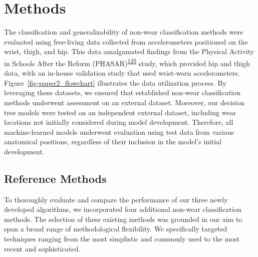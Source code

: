 \documentclass[
  10pt,
]{scrbook}
\begin{document}
\hypertarget{methods-1}{%
\section{Methods}\label{methods-1}}

The classification and generalizability of non-wear classification
methods were evaluated using free-living data collected from
accelerometers positioned on the wrist, thigh, and hip. This data
amalgamated findings from the Physical Activity in Schools After the
Reform
(PHASAR)\textsuperscript{\protect\hyperlink{ref-pedersen_protocol_2018}{135}}
study, which provided hip and thigh data, with an in-house validation
study that used wrist-worn accelerometers.
Figure~\ref{fig-paper2_flowchart} illustrates the data utilization
process. By leveraging these datasets, we ensured that established
non-wear classification methods underwent assessment on an external
dataset. Moreover, our decision tree models were tested on an
independent external dataset, including wear locations not initially
considered during model development. Therefore, all machine-learned
models underwent evaluation using test data from various anatomical
positions, regardless of their inclusion in the model's initial
development.

\hypertarget{reference-methods}{%
\subsection{Reference Methods}\label{reference-methods}}

To thoroughly evaluate and compare the performance of our three newly
developed algorithms, we incorporated four additional non-wear
classification methods. The selection of these existing methods was
grounded in our aim to span a broad range of methodological flexibility.
We specifically targeted techniques ranging from the most simplistic and
commonly used to the most recent and sophisticated.
\end{document}
